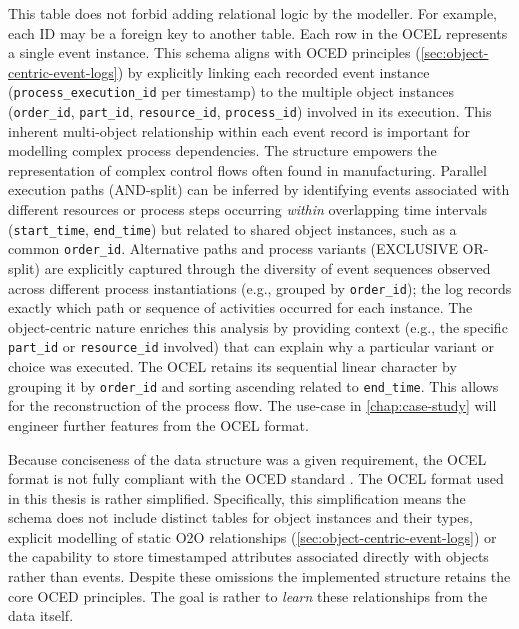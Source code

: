 This table does not forbid adding relational logic by the modeller. For example, each ID may be a foreign key to another table. Each row in the OCEL represents a single event instance. This schema aligns with OCED principles (\autoref{sec:object-centric-event-logs}) by explicitly linking each recorded event instance (\texttt{process\_execution\_id} per timestamp) to the multiple object instances (\texttt{order\_id}, \texttt{part\_id}, \texttt{resource\_id}, \texttt{process\_id}) involved in its execution. This inherent multi-object relationship within each event record is important for modelling complex process dependencies. The structure empowers the representation of complex control flows often found in manufacturing. Parallel execution paths (AND-split) can be inferred by identifying events associated with different resources or process steps occurring \textit{within} overlapping time intervals (\texttt{start\_time}, \texttt{end\_time}) but related to shared object instances, such as a common \texttt{order\_id}. Alternative paths and process variants (EXCLUSIVE OR-split) are explicitly captured through the diversity of event sequences observed across different process instantiations (e.g., grouped by \texttt{order\_id}); the log records exactly which path or sequence of activities occurred for each instance. The object-centric nature enriches this analysis by providing context (e.g., the specific \texttt{part\_id} or \texttt{resource\_id} involved) that can explain why a particular variant or choice was executed. The OCEL retains its sequential linear character by grouping it by \texttt{order\_id} and sorting ascending related to \texttt{end\_time}. This allows for the reconstruction of the process flow. The use-case in \autoref{chap:case-study} will engineer further features from the OCEL format.

Because conciseness of the data structure was a given requirement, the OCEL format is not fully compliant with the OCED standard \autocite{van2023object}. The OCEL format used in this thesis is rather simplified. Specifically, this simplification means the schema does not include distinct tables for object instances and their types, explicit modelling of static O2O relationships (\autoref{sec:object-centric-event-logs}) or the capability to store timestamped attributes associated directly with objects rather than events. Despite these omissions the implemented structure retains the core OCED principles. The goal is rather to \textit{learn} these relationships from the data itself.

